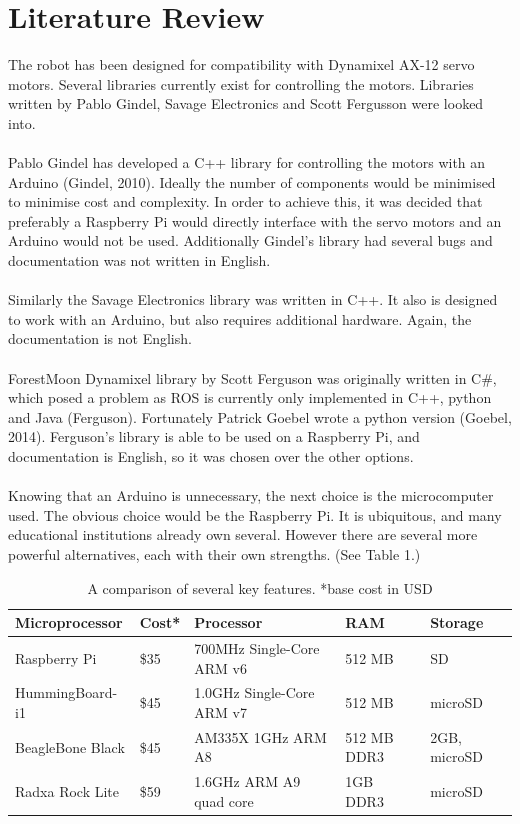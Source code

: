 \documentclass[]{article}
\begin{document}
\section{Literature Review}
The robot has been designed for compatibility with Dynamixel AX-12 servo motors. Several libraries currently exist for controlling the motors. Libraries written by Pablo Gindel, Savage Electronics and Scott Fergusson were looked into.
\\
\\
Pablo Gindel has developed a C++ library for controlling the motors with an Arduino (Gindel, 2010). Ideally the number of components would be minimised to minimise cost and complexity. In order to achieve this, it was decided that preferably a Raspberry Pi would directly interface with the servo motors and an Arduino would not be used. Additionally Gindel's library had several bugs and documentation was not written in English.
\\
\\
Similarly the Savage Electronics library was written in C++. It also is designed to work with an Arduino, but also requires additional hardware. Again, the documentation is not English.
\\
\\
ForestMoon Dynamixel library by Scott Ferguson was originally written in C\#, which posed a problem as ROS is currently only implemented in C++, python and Java (Ferguson). Fortunately Patrick Goebel wrote a python version (Goebel, 2014). Ferguson's library is able to be used on a Raspberry Pi, and documentation is English, so it was chosen over the other options.
\\
\\
Knowing that an Arduino is unnecessary, the next choice is the microcomputer used. The obvious choice would be the Raspberry Pi. It is ubiquitous, and many educational institutions already own several. However there are several more powerful alternatives, each with their own strengths. (See Table 1.)

\begin{table}[h]
\centering
\begin{tabular}[c]{l l p{2.5cm} l p{1.7cm}}
Microprocessor   & Cost* & Processor                             & RAM             & Storage                    \\
\hline
Raspberry Pi     & \$35      & 700MHz Single-Core ARM v6             & 512 MB      & SD                         \\
HummingBoard-i1  & \$45      & 1.0GHz Single-Core ARM v7             & 512 MB      &             microSD               \\
BeagleBone Black & \$45      & AM335X 1GHz ARM A8             & 512 MB DDR3 & 2GB, microSD \\
Radxa Rock Lite  & \$59      & 1.6GHz  ARM A9 quad core & 1GB DDR3           & microSD                   
\end{tabular}
\caption{A comparison of several key features. *base cost in USD}
\end{table}
\end{document}
